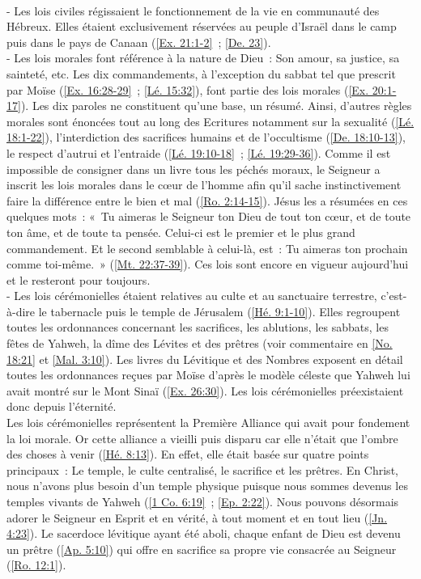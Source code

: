 \begin{multicols}{2}
{\\- Les lois civiles régissaient le fonctionnement de la vie en communauté des Hébreux. Elles étaient exclusivement réservées au peuple d'Israël dans le camp puis dans le pays de Canaan (\vref{Ex. 21:1-2}~; \vref{De. 23}).
\\- Les lois morales font référence à la nature de Dieu~: Son amour, sa justice, sa sainteté, etc. Les dix commandements, à l'exception du sabbat tel que prescrit par Moïse (\vref{Ex. 16:28-29}~; \vref{Lé. 15:32}), font partie des lois morales (\vref{Ex. 20:1-17}). Les dix paroles ne constituent qu'une base, un résumé. Ainsi, d'autres règles morales sont énoncées tout au long des Ecritures notamment sur la sexualité (\vref{Lé. 18:1-22}), l'interdiction des sacrifices humains et de l'occultisme (\vref{De. 18:10-13}), le respect d'autrui et l'entraide (\vref{Lé. 19:10-18}~; \vref{Lé. 19:29-36}). Comme il est impossible de consigner dans un livre tous les péchés moraux, le Seigneur a inscrit les lois morales dans le cœur de l'homme afin qu'il sache instinctivement faire la différence entre le bien et mal (\vref{Ro. 2:14-15}). Jésus les a résumées en ces quelques mots~: «~Tu aimeras le Seigneur ton Dieu de tout ton cœur, et de toute ton âme, et de toute ta pensée. Celui-ci est le premier et le plus grand commandement. Et le second semblable à celui-là, est~: Tu aimeras ton prochain comme toi-même.~» (\vref{Mt. 22:37-39}). Ces lois sont encore en vigueur aujourd'hui et le resteront pour toujours.
\\- Les lois cérémonielles étaient relatives au culte et au sanctuaire terrestre, c'est-à-dire le tabernacle puis le temple de Jérusalem (\vref{Hé. 9:1-10}). Elles regroupent toutes les ordonnances concernant les sacrifices, les ablutions, les sabbats, les fêtes de Yahweh, la dîme des Lévites et des prêtres (voir commentaire en \vref{No. 18:21} et \vref{Mal. 3:10}). Les livres du Lévitique et des Nombres exposent en détail toutes les ordonnances reçues par Moïse d'après le modèle céleste que Yahweh lui avait montré sur le Mont Sinaï (\vref{Ex. 26:30}). Les lois cérémonielles préexistaient donc depuis l'éternité.
\\Les lois cérémonielles représentent la Première Alliance qui avait pour fondement la loi morale. Or cette alliance a vieilli puis disparu car elle n'était que l'ombre des choses à venir (\vref{Hé. 8:13}). En effet, elle était basée sur quatre points principaux~: Le temple, le culte centralisé, le sacrifice et les prêtres. En Christ, nous n'avons plus besoin d'un temple physique puisque nous sommes devenus les temples vivants de Yahweh (\vref{1 Co. 6:19}~; \vref{Ep. 2:22}). Nous pouvons désormais adorer le Seigneur en Esprit et en vérité, à tout moment et en tout lieu (\vref{Jn. 4:23}). Le sacerdoce lévitique ayant été aboli, chaque enfant de Dieu est devenu un prêtre (\vref{Ap. 5:10}) qui offre en sacrifice sa propre vie consacrée au Seigneur (\vref{Ro. 12:1}).
}
\end{multicols}
